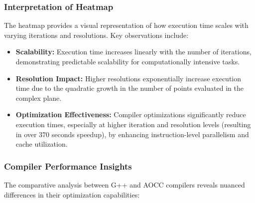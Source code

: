 \documentclass[
	report, %
	11pt, %
]{CSUniSchoolLabReport}
\newcounter{ct}
\begin{document}
\subsubsection{Interpretation of Heatmap}

The heatmap provides a visual representation of how execution time scales with varying iterations and resolutions. Key observations include:

\begin{itemize}
	\item \textbf{Scalability:} Execution time increases linearly with the number of iterations, demonstrating predictable scalability for computationally intensive tasks.
	\item \textbf{Resolution Impact:} Higher resolutions exponentially increase execution time due to the quadratic growth in the number of points evaluated in the complex plane.
	\item \textbf{Optimization Effectiveness:} Compiler optimizations significantly reduce execution times, especially at higher iteration and resolution levels (resulting in over 370 seconds speedup), by enhancing instruction-level parallelism and cache utilization.
\end{itemize}

\subsubsection{Compiler Performance Insights}

The comparative analysis between G++ and AOCC compilers reveals nuanced differences in their optimization capabilities:
\end{document}
